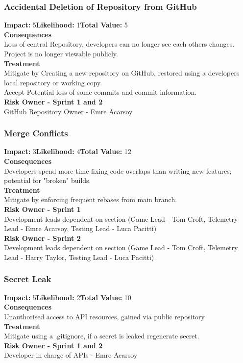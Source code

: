 \documentclass[11pt]{article}
\begin{document}
\subsubsection{Accidental Deletion of Repository from GitHub}
\textbf{Impact:} 5\quad \textbf{Likelihood:} 1\quad \textbf{Total Value:} 5\\
\textbf{Consequences}\\
Loss of central Repository, developers can no longer see each others changes. Project is no longer viewable publicly.\\
\textbf{Treatment}\\
Mitigate by Creating a new repository on GitHub, restored using a developers local repository or working copy.\\
Accept Potential loss of some commits and commit information.\\
\textbf{Risk Owner - Sprint 1 and 2}\\
GitHub Repository Owner - Emre Acarsoy
\subsubsection{Merge Conflicts}
\textbf{Impact:} 3\quad \textbf{Likelihood:} 4\quad \textbf{Total Value:} 12\\
\textbf{Consequences}\\
Developers spend more time fixing code overlaps than writing new features; potential for "broken" builds.\\
\textbf{Treatment}\\
Mitigate by enforcing frequent rebases from main branch.\\
\textbf{Risk Owner - Sprint 1}\\
Development leads dependent on section (Game Lead - Tom Croft, Telemetry Lead - Emre Acarsoy, Testing Lead - Luca Pacitti)\\
\textbf{Risk Owner - Sprint 2}\\
Development leads dependent on section (Game Lead - Tom Croft, Telemetry Lead - Harry Taylor, Testing Lead - Luca Pacitti)
\subsubsection{Secret Leak}
\textbf{Impact:} 5\quad \textbf{Likelihood:} 2\quad \textbf{Total Value:} 10\\
\textbf{Consequences}\\
Unauthorised access to API resources, gained via public repository\\
\textbf{Treatment}\\
Mitigate using a .gitignore, if a secret is leaked regenerate secret.\\
\textbf{Risk Owner - Sprint 1 and 2}\\
Developer in charge of APIs - Emre Acarsoy
\end{document}
